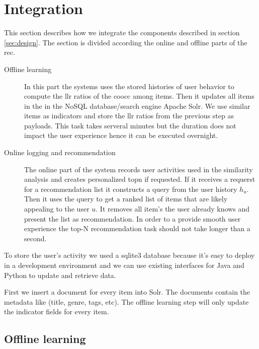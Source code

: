 \section{Integration}
\label{sec:integration}

This section describes how we integrate the components described in section \ref{sec:design}. The section is divided according the online and offline parts of the \gls{rec}.

\begin{description}
\item[Offline learning] In this part the systems uses the stored histories of user behavior to compute the \gls{llr} ratios of the \gls{coocc} among items. Then it updates all items in the in the NoSQL database/search engine Apache Solr. We use similar items as indicators and store the \gls{llr} ratios from the previous step as payloads. This task takes serveral minutes but the duration does not impact the user experience hence it can be executed overnight. 
\item[Online logging and recommendation] The online part of the system records user activities used in the similarity analysis and creates personalized \gls{topn} if requested. If it receives a requerst for a recommendation list it constructs a query from the user history $h_u$. Then it uses the query to get a ranked list of items that are likely appealing to the user $u$. It removes all item's the user already knows and present the list as recommendation. In order to a  provide smooth user experience the top-N recommendation task should not take longer than a second.
\end{description}

To store the user's activity we used a sqlite3 database because it's easy to deploy in a development environment and we can use existing interfaces for Java and Python to update and retrieve data. 

First we insert a document for every item into Solr. The documents contain the metadata like (title, genre, tags, etc). The offline learning step will only update the indicator fields for every item.

\subsection{Offline learning}
\label{sec:offline}

